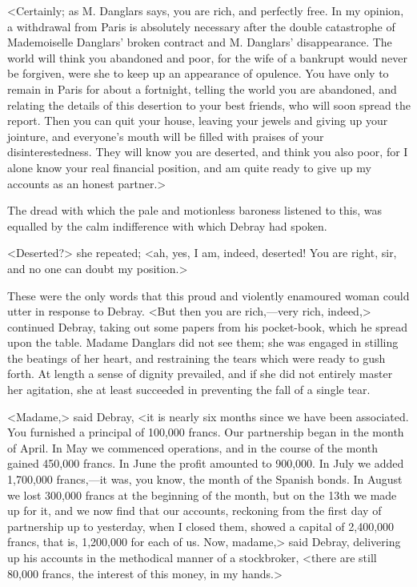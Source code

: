  <Certainly; as M. Danglars says, you are rich, and perfectly free. In my opinion, a withdrawal from Paris is absolutely necessary after the double catastrophe of Mademoiselle Danglars' broken contract and M. Danglars' disappearance. The world will think you abandoned and poor, for the wife of a bankrupt would never be forgiven, were she to keep up an appearance of opulence. You have only to remain in Paris for about a fortnight, telling the world you are abandoned, and relating the details of this desertion to your best friends, who will soon spread the report. Then you can quit your house, leaving your jewels and giving up your jointure, and everyone's mouth will be filled with praises of your disinterestedness. They will know you are deserted, and think you also poor, for I alone know your real financial position, and am quite ready to give up my accounts as an honest partner.> 

 The dread with which the pale and motionless baroness listened to this, was equalled by the calm indifference with which Debray had spoken. 

 <Deserted?> she repeated; <ah, yes, I am, indeed, deserted! You are right, sir, and no one can doubt my position.> 

 These were the only words that this proud and violently enamoured woman could utter in response to Debray.  <But then you are rich,—very rich, indeed,> continued Debray, taking out some papers from his pocket-book, which he spread upon the table. Madame Danglars did not see them; she was engaged in stilling the beatings of her heart, and restraining the tears which were ready to gush forth. At length a sense of dignity prevailed, and if she did not entirely master her agitation, she at least succeeded in preventing the fall of a single tear. 

 <Madame,> said Debray, <it is nearly six months since we have been associated. You furnished a principal of 100,000 francs. Our partnership began in the month of April. In May we commenced operations, and in the course of the month gained 450,000 francs. In June the profit amounted to 900,000. In July we added 1,700,000 francs,—it was, you know, the month of the Spanish bonds. In August we lost 300,000 francs at the beginning of the month, but on the 13th we made up for it, and we now find that our accounts, reckoning from the first day of partnership up to yesterday, when I closed them, showed a capital of 2,400,000 francs, that is, 1,200,000 for each of us. Now, madame,> said Debray, delivering up his accounts in the methodical manner of a stockbroker, <there are still 80,000 francs, the interest of this money, in my hands.> 

